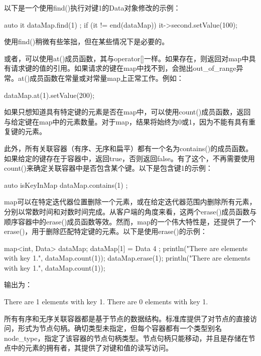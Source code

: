 以下是一个使用find()执行对键1的Data对象修改的示例：

\begin{cpp}
auto it { dataMap.find(1) };
if (it != end(dataMap)) {
    it->second.setValue(100);
}
\end{cpp}

使用find()稍微有些笨拙，但在某些情况下是必要的。

或者，可以使用at()成员函数，其与operator[]一样。如果存在，则返回对map中具有请求键的值的引用。如果请求的键在map中找不到，会抛出out\_of\_range异常。at()成员函数在常量或对常量map上正常工作。例如：

\begin{cpp}
dataMap.at(1).setValue(200);
\end{cpp}

如果只想知道具有特定键的元素是否在map中，可以使用count()成员函数，返回与给定键在map中的元素数量。对于map，结果将始终为0或1，因为不能有具有重复键的元素。

此外，所有关联容器（有序、无序和扁平）都有一个名为contains()的成员函数。如果给定的键存在于容器中，返回true，否则返回false。有了这个，不再需要使用count()来确定关联容器中是否包含某个键。以下是包含键1的示例：

\begin{cpp}
auto isKeyInMap { dataMap.contains(1) };
\end{cpp}


map可以在特定迭代器位置删除一个元素，或在给定迭代器范围内删除所有元素，分别以常数时间和对数时间完成。从客户端的角度来看，这两个erase()成员函数与顺序容器中的erase()成员函数等效。然而，map的一个伟大特性是，还提供了一个erase()，用于删除匹配特定键的元素。以下是使用erase()的示例：

\begin{cpp}
map<int, Data> dataMap;
dataMap[1] = Data { 4 };
println("There are {} elements with key 1.", dataMap.count(1));
dataMap.erase(1);
println("There are {} elements with key 1.", dataMap.count(1));
\end{cpp}

输出为：

\begin{shell}
There are 1 elements with key 1.
There are 0 elements with key 1.
\end{shell}


所有有序和无序关联容器都是基于节点的数据结构。标准库提供了对节点的直接访问，形式为节点句柄。确切类型未指定，但每个容器都有一个类型别名node\_type，指定了该容器的节点句柄类型。节点句柄只能移动，并且是存储在节点中的元素的拥有者，其提供了对键和值的读写访问。


